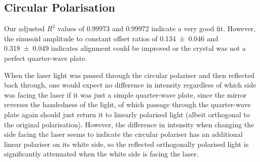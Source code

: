 \documentclass[a4paper]{scrartcl}
\begin{document}
\subsection{Circular Polarisation}
Our adjusted \(R^2\) values of 0.99973 and 0.99972 indicate a very good fit. However, the sinusoid amplitude to constant offset ratios of \SI{0.134 \pm 0.046}{} and \SI{0.318 \pm 0.049}{} indicates alignment could be improved or the crystal was not a perfect quarter-wave plate.

When the laser light was passed through the circular polariser and then reflected back through, one would expect no difference in intensity regardless of which side was facing the laser if it was just a simple quarter-wave plate, since the mirror reverses the handedness of the light, of which passage through the quarter-wave plate again should just return it to linearly polarised light (albeit orthogonal to the original polarisation). However, the difference in intensity when changing the side facing the laser seems to indicate the circular polariser has an additional linear polariser on its white side, so the reflected orthogonally polarised light is significantly attenuated when the white side is facing the laser.
\end{document}
